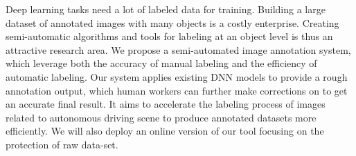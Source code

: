 Deep learning tasks need a lot of labeled data for training. Building a large dataset of annotated images with many objects is a costly enterprise. Creating semi-automatic algorithms and tools for labeling at an object level is thus an attractive research area. We propose a semi-automated image annotation system, which leverage both the accuracy of manual labeling and the efficiency of automatic labeling. Our system applies existing DNN models to provide a rough annotation output, which human workers can further make corrections on to get an accurate final result. It aims to accelerate the labeling process of images related to autonomous driving scene to produce annotated datasets more efficiently. We will also deploy an online version of our tool focusing on the protection of raw data-set. 
